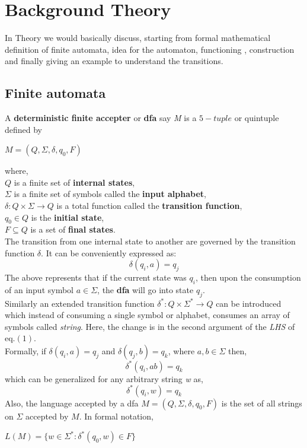 \documentclass[12pt,a4paper]{article}%
\begin{document}
	\section{Background Theory}
	In Theory we would basically discuss, starting from formal mathematical definition of finite automata, idea for the automaton, functioning , construction and finally giving an example to understand the transitions.
		\subsection{Finite automata}
		\begin{flushleft}
			A \textbf{deterministic finite accepter} or \textbf{dfa} say \textit{M} is a $5-tuple$ or quintuple defined by
			\begin{center}
				$M=(Q,\Sigma,\delta,q_0,F)$
			\end{center}
			where,\\\smallskip
			$Q$ is a finite set of \textbf{internal states},\\
			$\Sigma$ is a finite set of symbols called the \textbf{input alphabet},\\
			$\delta : Q \times \Sigma \rightarrow Q$ is a total function called the \textbf{transition function},\\
			$q_0 \in Q$ is the \textbf{initial state},\\
			$F \subseteq Q$ is a set of \textbf{final states}.\\\bigskip
			The transition from one internal state to another are governed by the transition function $\delta$. It can be conveniently expressed as:
			\begin{equation} \label{eq:1}
				\delta(q_i,a)=q_j
			\end{equation}
			The above represents that if the current state was $q_i$, then upon the consumption of an input symbol $a \in \Sigma$, the \textbf{dfa} will go into state $q_j$.\\\bigskip
			Similarly an extended transition function $\delta ^{*} : Q \times \Sigma^{*} \rightarrow Q$ can be introduced which instead of consuming a single symbol or alphabet, consumes an array of symbols called \textit{string}. Here, the change is in the second argument of the \textit{LHS} of eq.$(1)$.\\\bigskip
			Formally, if $\delta(q_i,a)=q_j$ and $\delta(q_j,b)=q_k$, where $a,b \in \Sigma$ then,
			\begin{equation} 
				\delta^{*}(q_i,ab)=q_k
			\end{equation}
			which can be generalized for any arbitrary string \textit{w} as,
			\begin{equation} 
				\delta^{*}(q_i,w)=q_k
			\end{equation}
			Also, the language accepted by a dfa $M=(Q,\Sigma,\delta,q_0,F)$ is the set of all strings on $\Sigma$ accepted by $M$. In formal notation,
			\begin{center}
				$L(M)=\{w \in \Sigma^{*}:\delta^{*}(q_0,w)\in F\}$
			\end{center}
			\pagebreak
		\end{flushleft}
\end{document}
